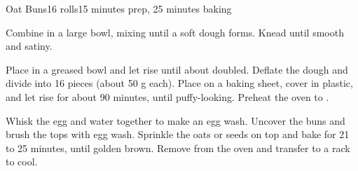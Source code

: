 \documentclass[../Cookbook.tex]{subfiles}
\begin{document}
\begin{recipe}[OatBuns]{Oat Buns}{16 rolls}{15 minutes prep, 25 minutes baking}

Combine in a large bowl, mixing until a soft dough forms.
Knead until smooth and satiny.

Place in a greased bowl and let rise until about doubled.
Deflate the dough and divide into 16 pieces (about 50 g each).
Place on a baking sheet, cover in plastic, and let rise for about 90 minutes, until puffy-looking.
Preheat the oven to .

Whisk the egg and water together to make an egg wash.
Uncover the buns and brush the tops with egg wash.
Sprinkle the oats or seeds on top and bake for 21 to 25 minutes, until golden brown.
Remove from the oven and transfer to a rack to cool.
\end{recipe}
\end{document}
